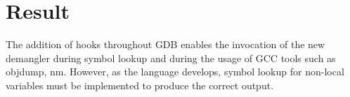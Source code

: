 \section{Result}
The addition of hooks throughout GDB enables the invocation of the new \CFAS
demangler during symbol lookup and during the usage of GCC tools such as
objdump, nm. However, as the
language develops, symbol lookup for non-local variables must be implemented to
produce the correct output.
